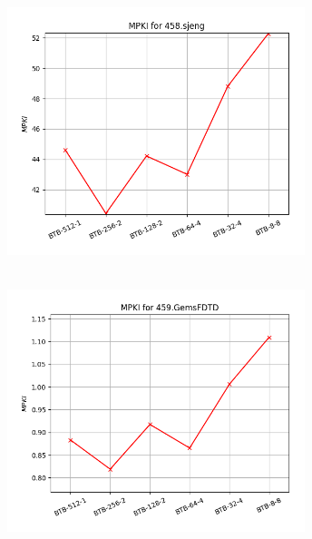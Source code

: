   \begin{minipage}{\textwidth}
      \begin{center}
         \\
         \vspace{3mm}
         \includegraphics[width=0.65\textwidth, frame]{./graphs/4-3/458-sjeng.png}
         \vspace{6mm}
      \end{center}
   \end{minipage}

   \begin{minipage}{\textwidth}
      \begin{center}
         \\
         \vspace{3mm}
         \includegraphics[width=0.65\textwidth, frame]{./graphs/4-3/459-GemsFDTD.png}
         \vspace{6mm}
      \end{center}
   \end{minipage}

